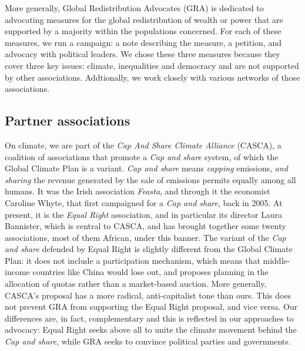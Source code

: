 \documentclass[a5paper,english,openany]{memoir}
\begin{document}
More generally, Global Redistribution Advocates (GRA) is dedicated to advocating measures for the global redistribution of wealth or power that are supported by a majority within the populations concerned. For each of these measures, we run %
a campaign: a note describing the measure, a petition, and advocacy with political leaders. We chose these three measures because they cover three key issues: climate, inequalities and democracy %
and are not supported by other associations. Addtionally, %
we work closely with various networks of those %
associations. 

\subsection*{Partner associations}

On climate, we are part of the \textit{Cap And Share Climate Alliance} (CASCA), a coalition of associations that promote %
a \textit{Cap and share} system, of which the Global Climate Plan is a variant. \textit{Cap and share} means \textit{capping} emissions, \textit{and sharing} the revenue generated by the sale of emissions permits equally among all humans. It was the Irish association \textit{Feasta}, and through it the economist Caroline Whyte, %
that first campaigned for a \textit{Cap and share}, back in 2005. At present, it is the \textit{Equal Right} association, and in particular its director Laura Bannister, %
which is central to CASCA, and has brought together some twenty associations, most of them African, %
under this banner. The variant of the \textit{Cap and share} defended by Equal Right is slightly different from the Global Climate Plan: it does not include a participation mechanism, which means that middle-income countries like China would lose out, %
and proposes planning in the allocation of quotas rather than a market-based auction. More generally, CASCA's proposal has a more radical, anti-capitalist tone than ours. This does not prevent GRA from supporting the Equal Right proposal, and vice versa. Our differences are, in fact, complementary %
and this is reflected in our approaches to advocacy: Equal Right seeks above all to unite the climate movement behind the \textit{Cap and share}, while GRA seeks to convince political parties and governments. 
\end{document}
